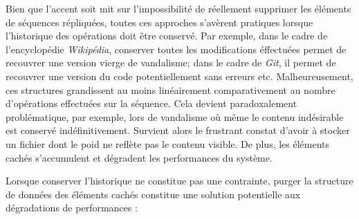 Bien que l'accent soit mit sur l'impossibilité de réellement supprimer les
éléments de séquences répliquées, toutes ces approches s'avèrent pratiques
lorsque l'historique des opérations doit être conservé. Par exemple, dans le
cadre de l'encyclopédie \emph{Wikipédia}, conserver toutes les modifications
éffectuées permet de recouvrer une version vierge de vandalisme; dans le cadre
de \emph{Git}, il permet de recouvrer une version du code potentiellement sans
erreurs etc. Malheureusement, ces structures grandissent au moins linéairement
comparativement au nombre d'opérations effectuées sur la séquence. Cela devient
paradoxalement problématique, par exemple, lors de vandalisme où même le contenu
indésirable est conservé indéfinitivement. Survient alors le frustrant constat
d'avoir à stocker un fichier dont le poid ne reflète pas le contenu visible. De
plus, les éléments cachés s'accumulent et dégradent  les
performances du système.

Lorsque conserver l'historique ne constitue pas une contrainte, purger la
structure de données des éléments cachés constitue une solution potentielle aux
dégradations de performances :




